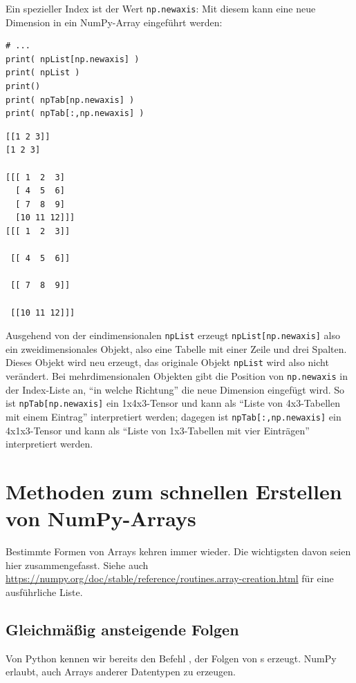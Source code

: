 Ein spezieller Index ist der Wert \texttt{np.newaxis}: Mit diesem kann eine neue Dimension in ein NumPy-Array eingeführt werden:

\begin{codebox}
\begin{verbatim}
# ...
print( npList[np.newaxis] )
print( npList )
print()
print( npTab[np.newaxis] )
print( npTab[:,np.newaxis] )
\end{verbatim}
\end{codebox}
%
\begin{cmdbox}
\begin{verbatim}
[[1 2 3]]
[1 2 3]

[[[ 1  2  3]
  [ 4  5  6]
  [ 7  8  9]
  [10 11 12]]]
[[[ 1  2  3]]

 [[ 4  5  6]]

 [[ 7  8  9]]

 [[10 11 12]]]
\end{verbatim}
\end{cmdbox}

Ausgehend von der eindimensionalen \texttt{npList} erzeugt \texttt{npList[np.newaxis]} also ein zweidimensionales Objekt, also eine Tabelle mit einer Zeile und drei Spalten. Dieses Objekt wird neu erzeugt, \ie das originale Objekt \texttt{npList} wird also nicht verändert. Bei mehrdimensionalen Objekten gibt die Position von \texttt{np.newaxis} in der Index-Liste an, \enquote{in welche Richtung} die neue Dimension eingefügt wird. So ist \texttt{npTab[np.newaxis]} ein 1x4x3-Tensor und kann als \enquote{Liste von 4x3-Tabellen mit einem Eintrag} interpretiert werden; dagegen ist \texttt{npTab[:,np.newaxis]} ein 4x1x3-Tensor und kann als \enquote{Liste von 1x3-Tabellen mit vier Einträgen} interpretiert werden.

\section{Methoden zum schnellen Erstellen von NumPy-Arrays}
Bestimmte Formen von Arrays kehren immer wieder. Die wichtigsten davon seien hier zusammengefasst. Siehe auch \url{https://numpy.org/doc/stable/reference/routines.array-creation.html} für eine ausführliche Liste.

\subsection{Gleichmäßig ansteigende Folgen}
Von Python kennen wir bereits den Befehl , der Folgen von s erzeugt. NumPy erlaubt, auch Arrays anderer Datentypen zu erzeugen.

